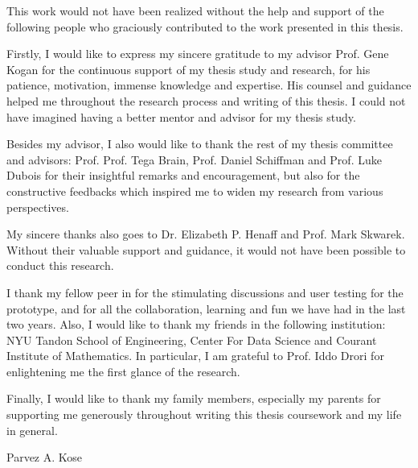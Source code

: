 %
%
%
%
%

\begin{acknowledgments} 

This work would not have been realized without the help and support of the following people who graciously contributed to the work presented in this thesis.

Firstly, I would like to express my sincere gratitude to my advisor Prof. Gene Kogan for the continuous support of my thesis study and research, for his patience, motivation, immense knowledge and expertise. His counsel and guidance helped me throughout the research process and writing of this thesis. I could not have imagined having a better mentor and advisor for my thesis study.

Besides my advisor, I also would like to thank the rest of my thesis committee and advisors: Prof. Prof. Tega Brain, Prof. Daniel Schiffman and Prof. Luke Dubois for their insightful remarks and encouragement, but also for the constructive feedbacks which inspired me to widen my research from various perspectives.

My sincere thanks also goes to Dr. Elizabeth P. Henaff and Prof. Mark Skwarek. Without their valuable support and guidance, it would not have been possible to conduct this research.

I thank my fellow peer in for the stimulating discussions and user testing for the prototype, and for all the collaboration, learning and fun we have had in the last two years. Also, I would like to thank my friends in the following institution: NYU Tandon School of Engineering, Center For Data Science and Courant Institute of Mathematics. In particular, I am grateful to Prof. Iddo Drori for enlightening me the first glance of the research.

Finally, I would like to thank my family members, especially my parents for supporting me generously throughout writing this thesis coursework and my life in general.

\begin{flushright} 
Parvez A. Kose
\end{flushright}
\end{acknowledgments}

